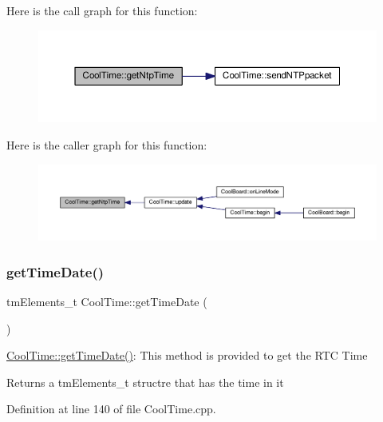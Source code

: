 Here is the call graph for this function\+:\nopagebreak
\begin{figure}[H]
\begin{center}
\leavevmode
\includegraphics[width=350pt]{d6/d49/class_cool_time_a41fbbbfd651c2079f54d4b2911e4c705_cgraph}
\end{center}
\end{figure}
Here is the caller graph for this function\+:\nopagebreak
\begin{figure}[H]
\begin{center}
\leavevmode
\includegraphics[width=350pt]{d6/d49/class_cool_time_a41fbbbfd651c2079f54d4b2911e4c705_icgraph}
\end{center}
\end{figure}
\mbox{\label{class_cool_time_a7a7501c5ca77dd1248bea704c44f986c}} 
\subsubsection{\texorpdfstring{get\+Time\+Date()}{getTimeDate()}}
{\footnotesize\ttfamily tm\+Elements\+\_\+t Cool\+Time\+::get\+Time\+Date (\begin{DoxyParamCaption}{ }\end{DoxyParamCaption})}

\hyperlink{class_cool_time_a7a7501c5ca77dd1248bea704c44f986c}{Cool\+Time\+::get\+Time\+Date()}\+: This method is provided to get the R\+TC Time

\begin{DoxyReturn}{Returns}
a tm\+Elements\+\_\+t structre that has the time in it 
\end{DoxyReturn}


Definition at line 140 of file Cool\+Time.\+cpp.


